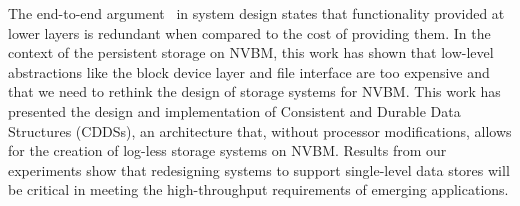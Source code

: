 The end-to-end argument~\cite{Saltzer84} in system design states that
functionality provided at lower layers is redundant when compared to the cost
of providing them. In the context of the persistent storage on NVBM, this work
has shown that low-level abstractions like the block device layer and file
interface are too expensive and that we need to rethink the design of storage
systems for NVBM\@. This work has presented the design and implementation of
Consistent and Durable Data Structures (CDDSs), an architecture that, without
processor modifications, allows for the creation of log-less storage systems on
NVBM\@.  Results from our experiments show that redesigning systems to support
single-level data stores will be critical in meeting the high-throughput
requirements of emerging applications. 

